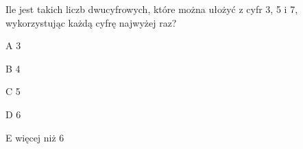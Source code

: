 \begin{tresc}
Ile jest takich liczb dwucyfrowych, które można ułożyć z cyfr 3, 5 i 7, wykorzystując każdą cyfrę najwyżej raz?
\end{tresc}
\begin{wariant}{A} 3 \end{wariant}
\begin{wariant}{B} 4 \end{wariant}
\begin{wariant}{C} 5 \end{wariant}
\begin{wariant}{D} 6 \end{wariant}
\begin{wariant}{E} więcej niż 6 \end{wariant}
